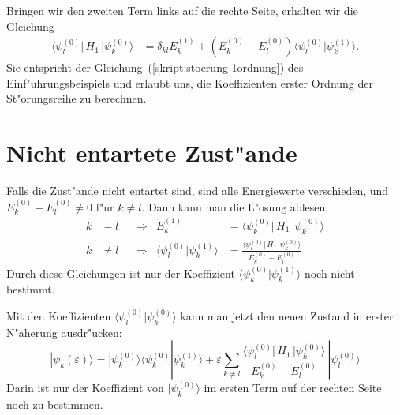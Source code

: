 Bringen wir den zweiten Term links auf die rechte Seite, erhalten wir
die Gleichung
\begin{align*}
\langle \psi_l^{(0)}|\, H_1 \,|\psi_k^{(0)}\rangle
&=
\delta_{kl} E_k^{(1)}
+
(E_k^{(0)}-E_l^{(0)})\langle\psi_l^{(0)}|\psi_k^{(1)}\rangle.
\end{align*}
Sie entspricht der Gleichung~(\ref{skript:stoerung-1ordnung})
des Einf"uhrungsbeispiels und erlaubt uns, die Koeffizienten
erster Ordnung der St"orungsreihe zu berechnen.

\section{Nicht entartete Zust"ande\label{section:nichtentartetezustaende}}
Falls die Zust"ande nicht entartet sind, sind alle Energiewerte
verschieden, und $E_k^{(0)}-E_l^{(0)}\ne 0$ f"ur $k\ne l$. 
Dann kann man die L"osung ablesen:
\begin{equation}
\begin{aligned}
k&=l
&&\Rightarrow&
E_k^{(1)}
&=
\langle \psi_k^{(0)}|\, H_1 \,|\psi_k^{(0)}\rangle
\\
k&\ne l
&&\Rightarrow&
\langle\psi_l^{(0)}|\psi_k^{(1)}\rangle
&=
\frac{\langle \psi_l^{(0)}|\, H_1 \,|\psi_k^{(0)}\rangle}{E_k^{(0)}-E_l^{(0)}}
\end{aligned}
\label{skript:stoerungsloesung1ordnung}
\end{equation}
Durch diese Gleichungen ist nur der Koeffizient
$\langle\psi_k^{(0)}|\psi_k^{(1)}\rangle$
noch nicht bestimmt.

Mit den Koeffizienten $\langle\psi_l^{(0)}|\psi_k^{(0)}\rangle$ kann
man jetzt den neuen Zustand in erster N"aherung ausdr"ucken:
\begin{equation}
|\psi_k(\varepsilon)\rangle
=
|\psi_k^{(0)}\rangle
\langle\psi_k^{(0)}|\psi_k^{(1)}\rangle
+\varepsilon
\sum_{k\ne l}
\frac{\langle \psi_l^{(0)}|\, H_1 \,|\psi_k^{(0)}\rangle}{E_k^{(0)}-E_l^{(0)}}
\,
|\psi_l^{(0)}\rangle
\end{equation}
Darin ist nur der Koeffizient von $|\psi_k^{(0)}\rangle$ im ersten
Term auf der rechten Seite noch zu bestimmen.

